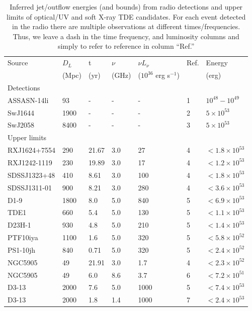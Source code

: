 \documentclass[usenatbib,fleqn]{mnras}
\begin{document}
\begin{table}
\begin{threeparttable}
  \caption{\label{tab:enConstr} Inferred jet/outflow energies (and
    bounds) from radio detections and upper limits of optical/UV and
    soft X-ray TDE candidates. For each event detected in the radio
    there are multiple observations at different
    times/frequencies. Thus, we leave a dash in the time frequency,
    and luminosity columns and simply to refer to reference in column
    ``Ref.''}
\begin{tabular*}{1.5\columnwidth}{lllllll}
\hline
Source & $D_L$ & t & $\nu$ & $\nu L_{\nu}$ & Ref. & Energy\\
& (Mpc) & (yr) & (GHz) & ($10^{36}$ erg s$^{-1}$) & & (erg) \\
\hline
Detections \\
\hline
ASSASN-14li & 93 & - & - & - & 1 &  $10^{48}-10^{49}$\\
SwJ1644 & 1900 & - & - & - &  2  & $5\times 10^{53}$\\
SwJ2058 & 8400  & - & - & - & 3 & $5\times 10^{53}$\\ 
\hline 
Upper limits & \\
\hline
RXJ1624+7554 & 290 & 21.67 & 3.0 & 27 & 4 & $< 1.8 \times 10^{ 53 }$ \\
RXJ1242-1119 & 230 & 19.89 & 3.0 & 17 & 4 & $< 1.2 \times 10^{ 53 }$ \\
SDSSJ1323+48 & 410 & 8.61 & 3.0 & 100 & 4 & $< 1.8 \times 10^{ 53 }$ \\
SDSSJ1311-01 & 900 & 8.21 & 3.0 & 280 & 4 & $< 3.6 \times 10^{ 53 }$ \\
D1-9 & 1800 & 8.0 & 5.0 & 840 & 5 & $< 6.9 \times 10^{ 53 }$ \\
TDE1 & 660 & 5.4 & 5.0 & 130 & 5 & $< 1.1 \times 10^{ 53 }$ \\
D23H-1 & 930 & 4.8 & 5.0 & 210 & 5 & $< 1.4 \times 10^{ 53 }$ \\
PTF10iya & 1100 & 1.6 & 5.0 & 320 & 5 & $< 5.8 \times 10^{ 52 }$ \\
PS1-10jh & 840 & 0.71 & 5.0 & 320 & 5 & $< 2.4 \times 10^{ 52 }$\\
NGC5905 & 49 & 21.91 & 3.0 & 1.7 & 4 & $< 2.3 \times 10^{ 52 }$ \\
NGC5905 & 49 & 6.0 & 8.6 & 3.7 & 6 & $< 7.2 \times 10^{ 51 }$ \\
D3-13 & 2000 & 7.6 & 5.0 & 1000 & 5 & $< 7.4 \times 10^{ 53 }$ \\
D3-13 & 2000 & 1.8 & 1.4 & 1000 & 7 & $< 2.4 \times 10^{ 53 }$ \\

\end{tabular*}
\end{threeparttable}
\end{table}
\end{document}
